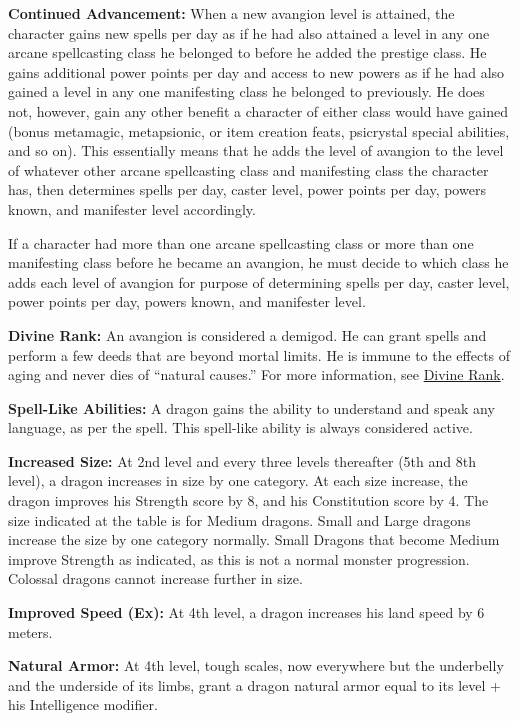{
\textbf{Continued Advancement:} When a new avangion level is attained, the character gains new spells per day as if he had also attained a level in any one arcane spellcasting class he belonged to before he added the prestige class. He gains additional power points per day and access to new powers as if he had also gained a level in any one manifesting class he belonged to previously. He does not, however, gain any other benefit a character of either class would have gained (bonus metamagic, metapsionic, or item creation feats, psicrystal special abilities, and so on). This essentially means that he adds the level of avangion to the level of whatever other arcane spellcasting class and manifesting class the character has, then determines spells per day, caster level, power points per day, powers known, and manifester level accordingly.

If a character had more than one arcane spellcasting class or more than one manifesting class before he became an avangion, he must decide to which class he adds each level of avangion for purpose of determining spells per day, caster level, power points per day, powers known, and manifester level.

\textbf{Divine Rank:} An avangion is considered a demigod. He can grant spells and perform a few deeds that are beyond mortal limits. He is immune to the effects of aging and never dies of ``natural causes.'' For more information, see \hyperref[Divine Rank]{Divine Rank}.

\textbf{Spell-Like Abilities:} A dragon gains the ability to understand and speak any language, as per the  spell. This spell-like ability is always considered active.


\textbf{Increased Size:} At 2nd level and every three levels thereafter (5th and 8th level), a dragon increases in size by one category. At each size increase, the dragon improves his Strength score by 8, and his Constitution score by 4. The size indicated at the table is for Medium dragons. Small and Large dragons increase the size by one category normally. Small Dragons that become Medium improve Strength as indicated, as this is not a normal monster progression. Colossal dragons cannot increase further in size.

\textbf{Improved Speed (Ex):} At 4th level, a dragon increases his land speed by 6 meters.

\textbf{Natural Armor:} At 4th level, tough scales, now everywhere but the underbelly and the underside of its limbs, grant a dragon natural armor equal to its level + his Intelligence modifier.

}
